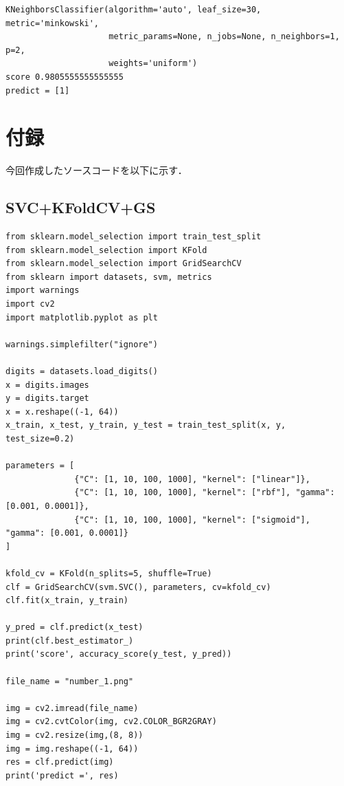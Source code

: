 \documentclass[a4paper, titlepage]{jsarticle}
\begin{document}
	\begin{lstlisting}
KNeighborsClassifier(algorithm='auto', leaf_size=30, metric='minkowski',
                     metric_params=None, n_jobs=None, n_neighbors=1, p=2,
                     weights='uniform')
score 0.9805555555555555
predict = [1]
	\end{lstlisting}

	\section{付録}
	今回作成したソースコードを以下に示す．

	\subsection{SVC+KFoldCV+GS}
	\begin{lstlisting}
from sklearn.model_selection import train_test_split
from sklearn.model_selection import KFold
from sklearn.model_selection import GridSearchCV
from sklearn import datasets, svm, metrics
import warnings
import cv2
import matplotlib.pyplot as plt

warnings.simplefilter("ignore")

digits = datasets.load_digits()
x = digits.images
y = digits.target
x = x.reshape((-1, 64))
x_train, x_test, y_train, y_test = train_test_split(x, y, test_size=0.2)

parameters = [
              {"C": [1, 10, 100, 1000], "kernel": ["linear"]},
              {"C": [1, 10, 100, 1000], "kernel": ["rbf"], "gamma": [0.001, 0.0001]},
              {"C": [1, 10, 100, 1000], "kernel": ["sigmoid"], "gamma": [0.001, 0.0001]}
]

kfold_cv = KFold(n_splits=5, shuffle=True)
clf = GridSearchCV(svm.SVC(), parameters, cv=kfold_cv)
clf.fit(x_train, y_train)

y_pred = clf.predict(x_test)
print(clf.best_estimator_)
print('score', accuracy_score(y_test, y_pred))

file_name = "number_1.png"

img = cv2.imread(file_name)
img = cv2.cvtColor(img, cv2.COLOR_BGR2GRAY)
img = cv2.resize(img,(8, 8))
img = img.reshape((-1, 64))
res = clf.predict(img)
print('predict =', res)
	\end{lstlisting}
\end{document}
